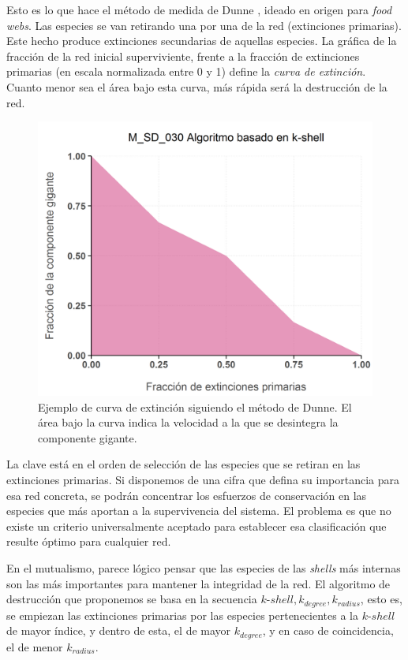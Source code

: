 Esto es lo que hace el método de medida de Dunne \cite{dunne2002biodiversity}, ideado en origen para \textit{food webs}. Las especies se van retirando una por una de la red (extinciones primarias). Este hecho produce extinciones secundarias de aquellas especies. La gráfica de la fracción de la red inicial superviviente, frente a la fracción de extinciones primarias (en escala normalizada entre 0 y 1) define la \textit{curva de extinción}. Cuanto menor sea el área bajo esta curva, más rápida será la destrucción de la red.

\begin{figure}[h!]
\centering
\includegraphics[scale=0.55]{Figures/ESTATICA_destruction_example.png}
\caption{Ejemplo de curva de extinción siguiendo el método de Dunne. El área bajo la curva indica la velocidad a la que se desintegra la componente gigante.}
\label{fig:ESTATICA_destruction_example}
\end{figure}

La clave está en el orden de selección de las especies que se retiran en las extinciones primarias. Si disponemos de una cifra que defina su importancia para esa red concreta, se podrán concentrar los esfuerzos de conservación en las especies que más aportan a la supervivencia del sistema. El problema es que no existe un criterio universalmente aceptado para establecer esa clasificación que resulte óptimo para cualquier red.

En el mutualismo, parece lógico pensar que las especies de las \textit{shells} más internas son las más importantes para mantener la integridad de la red. El algoritmo de destrucción que proponemos se basa en la secuencia $k$-$shell, k_{degree}, k_{radius}$, esto es, se empiezan las extinciones primarias por las especies pertenecientes a la $k$-$shell$ de mayor índice, y dentro de esta, el de mayor $k_{degree}$, y en caso de coincidencia, el de menor $k_{radius}$. 

